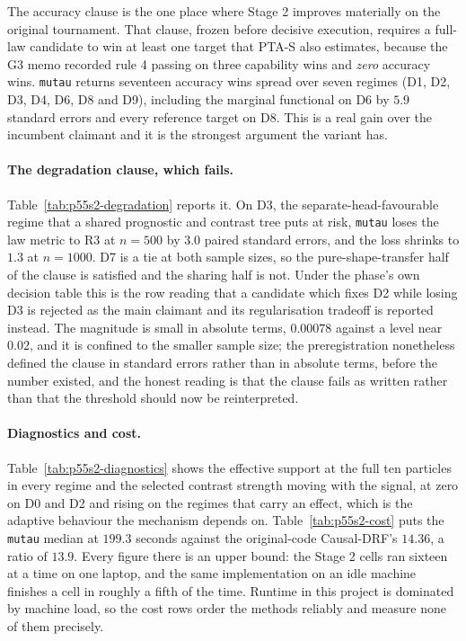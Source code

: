 The accuracy clause is the one place where Stage 2 improves materially on the
original tournament. That clause, frozen before decisive execution, requires a
full-law candidate to win at least one target that PTA-S also estimates, because
the G3 memo recorded rule 4 passing on three capability wins and \emph{zero}
accuracy wins. \texttt{mutau} returns seventeen accuracy wins spread over seven
regimes (D1, D2, D3, D4, D6, D8 and D9), including the marginal functional on
D6 by $5.9$ standard errors and every reference target on D8. This is a real
gain over the incumbent claimant and it is the strongest argument the variant
has.

\paragraph{The degradation clause, which fails.} Table~\ref{tab:p55s2-degradation}
reports it. On D3, the separate-head-favourable regime that a shared prognostic
and contrast tree puts at risk, \texttt{mutau} loses the law metric to R3 at
$n = 500$ by $3.0$ paired standard errors, and the loss shrinks to $1.3$ at
$n = 1000$. D7 is a tie at both sample sizes, so the pure-shape-transfer half of
the clause is satisfied and the sharing half is not. Under the phase's own
decision table this is the row reading that a candidate which fixes D2 while
losing D3 is rejected as the main claimant and its regularisation tradeoff is
reported instead. The magnitude is small in absolute terms, $0.00078$ against a
level near $0.02$, and it is confined to the smaller sample size; the
preregistration nonetheless defined the clause in standard errors rather than in
absolute terms, before the number existed, and the honest reading is that the
clause fails as written rather than that the threshold should now be
reinterpreted.

\paragraph{Diagnostics and cost.} Table~\ref{tab:p55s2-diagnostics} shows the
effective support at the full ten particles in every regime and the selected
contrast strength moving with the signal, at zero on D0 and D2 and rising on the
regimes that carry an effect, which is the adaptive behaviour the mechanism
depends on. Table~\ref{tab:p55s2-cost} puts the \texttt{mutau} median at
$199.3$ seconds against the original-code Causal-DRF's $14.36$, a ratio of
$13.9$. Every figure there is an upper bound: the Stage 2 cells ran sixteen at a
time on one laptop, and the same implementation on an idle machine finishes a
cell in roughly a fifth of the time. Runtime in this project is dominated by
machine load, so the cost rows order the methods reliably and measure none of
them precisely.

